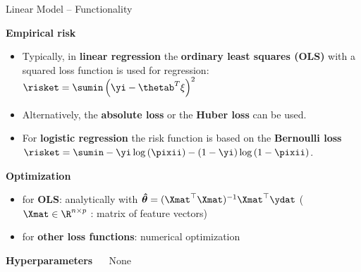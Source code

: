 \documentclass[11pt,compress,t,notes=noshow, xcolor=table]{beamer}
\newcommand{\highlight}[1]{\textcolor{highlightcol}{\textbf{#1}}}
\begin{document}
\begin{frame}{Linear Model -- Functionality}

\footnotesize

\highlight{Empirical risk}
\begin{itemize}\footnotesize
  \item Typically, in \textbf{linear regression} the \textbf{ordinary least squares (OLS)} with a squared loss function is used for regression: $\risket  = \sumin \left(\yi - \thetab^T \xi\right)^2$
    
   \item Alternatively, the \textbf{absolute loss} or the \textbf{Huber loss} can be used. %
  
  \item For \textbf{logistic regression} the risk function is based on the \textbf{Bernoulli loss} $\risket = \sumin -\yi \log \left(\pixii\right) - (1 - \yi) \log \left(1 - \pixii \right)$.
  


\end{itemize}

\footnotesize

\medskip

\highlight{Optimization}
\begin{itemize}\footnotesize
  \item for \textbf{OLS}: analytically with $\bm{\hat \theta} = (\Xmat^\top \Xmat)^{-1} \Xmat^\top\ydat$
  ($\Xmat \in \R^{n \times p}$ : matrix of feature vectors)
  \item for \textbf{other loss functions}: numerical optimization 
\end{itemize}

\medskip

\highlight{Hyperparameters} ~~ None

\medskip


\end{frame}

\end{document}
